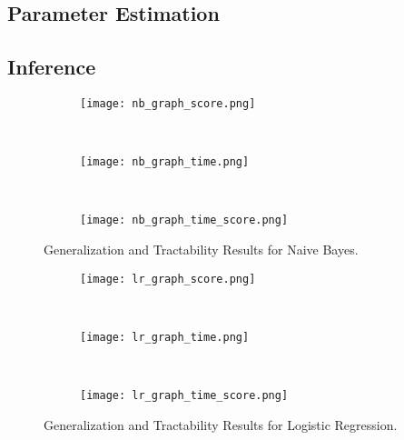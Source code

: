\documentclass{article}
\begin{document}
\subsection{Parameter Estimation}
\subsection{Inference}

\begin{figure}
  \centering
  \begin{subfigure}[b]{0.3\textwidth}
    \centering
    \texttt{[image: nb\_graph\_score.png]}
    \caption*{}
    \label{fig:nb_graph_score}
  \end{subfigure}
  ~
  \begin{subfigure}[b]{0.3\textwidth}
    \centering
    \texttt{[image: nb\_graph\_time.png]}
    \caption*{}
    \label{fig:nb_graph_time}
  \end{subfigure}
  ~
  \begin{subfigure}[b]{0.3\textwidth}
    \centering
    \texttt{[image: nb\_graph\_time\_score.png]}
    \caption*{}
    \label{fig:nb_graph_time_score}
  \end{subfigure}
  \vspace{-10pt}
  \caption{Generalization and Tractability Results for Naive Bayes.}
\end{figure}

\begin{figure}
  \centering
  \begin{subfigure}[b]{0.3\textwidth}
    \centering
    \texttt{[image: lr\_graph\_score.png]}
    \caption*{}
    \label{fig:lr_graph_score}
  \end{subfigure}
  ~
  \begin{subfigure}[b]{0.3\textwidth}
    \centering
    \texttt{[image: lr\_graph\_time.png]}
    \caption*{}
    \label{fig:lr_graph_time}
  \end{subfigure}
  ~
  \begin{subfigure}[b]{0.3\textwidth}
    \centering
    \texttt{[image: lr\_graph\_time\_score.png]}
    \caption*{}
    \label{fig:lr_graph_time_score}
  \end{subfigure}
  \vspace{-10pt}
  \caption{Generalization and Tractability Results for Logistic Regression.}
\end{figure}
\end{document}
